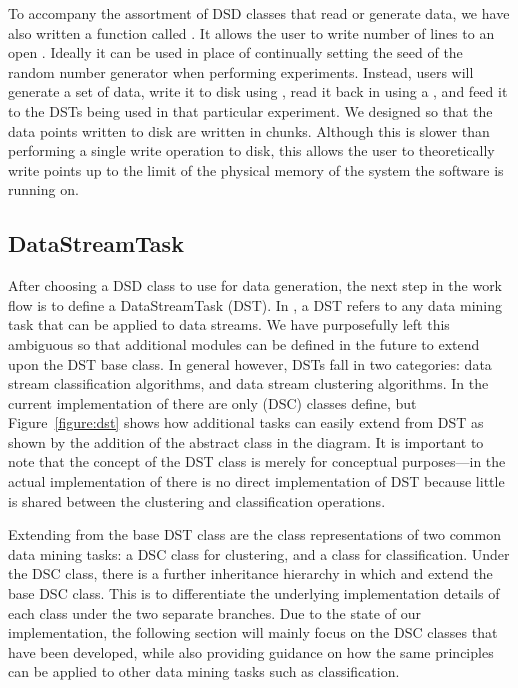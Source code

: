 \documentclass[nojss]{jss}
\begin{document}
To accompany the assortment of DSD classes that read or generate data, we have also written a function called . It allows the user to write  number of lines to an open  . Ideally it can be used in place of continually setting the seed of the random number generator when performing experiments. Instead, users will generate a set of data, write it to disk using , read it back in using a , and feed it to the DSTs being used in that particular experiment. We designed  so that the data points written to disk are written in chunks. Although this is slower than performing a single write operation to disk, this allows the user to theoretically write  points up to the limit of the physical memory of the system the software is running on.

\subsection{DataStreamTask}
\label{sec:design:dst}

After choosing a DSD class to use for data generation, the next step in the work flow is to define a DataStreamTask (DST). In , a DST refers to any data mining task that can be applied to data streams. We have purposefully left this ambiguous so that additional modules can be defined in the future to extend upon the DST base class. In general however, DSTs fall in two categories: data stream classification algorithms, and data stream clustering algorithms. In the current implementation of  there are only  (DSC) classes define, but Figure~\ref{figure:dst} shows how additional tasks can easily extend from DST as shown by the addition of the abstract class  in the diagram. It is important to note that the concept of the DST class is merely for conceptual purposes---in the actual implementation of  there is no direct implementation of DST because little is shared between the clustering and classification operations.


Extending from the base DST class are the class representations of two common data mining tasks: a DSC class for clustering, and a  class for classification. Under the DSC class, there is a further inheritance hierarchy in which  and  extend the base DSC class. This is to differentiate the underlying implementation details of each class under the two separate branches. Due to the state of our implementation, the following section will mainly focus on the DSC classes that have been developed, while also providing guidance on how the same principles can be applied to other data mining tasks such as classification.
\end{document}
